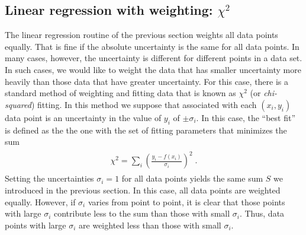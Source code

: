 \documentclass[letterpaper,10pt,english]{sphinxmanual}
\begin{document}

\subsection{Linear regression with weighting: $\chi^2$}
\label{chap7/chap7_funcs:index-6}\label{chap7/chap7_funcs:linear-regression-with-weighting}
The linear regression routine of the previous section weights all data points equally.  That is fine if the absolute uncertainty is the same for all data points.  In many cases, however, the uncertainty is different for different points in a data set.  In such cases, we would like to weight the data that has smaller uncertainty more heavily than those data that have greater uncertainty.  For this case, there is a standard method of weighting and fitting data that is known as $\chi^2$  (or \emph{chi-squared}) fitting.  In this method we suppose that associated with each $(x_{i},y_{i})$ data point is an uncertainty in the value of $y_{i}$ of $\pm\sigma_{i}$.  In this case, the ``best fit'' is defined as the the one with the set of fitting parameters that minimizes the sum
\label{chap7/chap7_funcs:equation-eq:chisq}\begin{gather}
\begin{split}\chi^2 = \sum_{i} \left(\frac{y_{i} - f(x_{i})} {\sigma_{i}}\right)^2 \;.\end{split}\label{chap7/chap7_funcs-eq:chisq}
\end{gather}
Setting the uncertainties $\sigma_{i}=1$ for all data points yields the same sum $S$ we introduced in the previous section.  In this case, all data points are weighted equally.  However, if $\sigma_{i}$ varies from point to point, it is clear that those points with large $\sigma_{i}$ contribute less to the sum than those with small $\sigma_{i}$.  Thus, data points with large $\sigma_{i}$ are weighted less than those with small $\sigma_{i}$.
\end{document}
